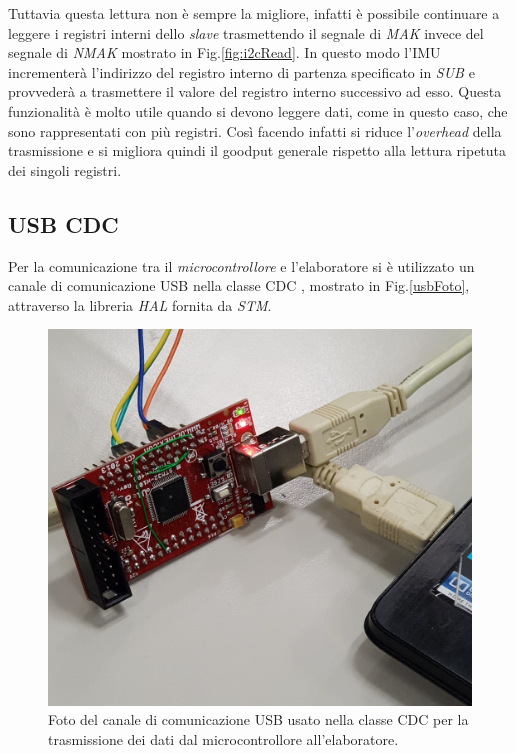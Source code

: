 Tuttavia questa lettura non è sempre la migliore, infatti è possibile continuare a leggere i registri interni dello \textit{slave} trasmettendo il segnale di \textit{MAK} invece del segnale di \textit{NMAK} mostrato in Fig.\ref{fig:i2cRead}. In questo modo l'IMU incrementerà l'indirizzo del registro interno di partenza specificato in \textit{SUB} e provvederà a trasmettere il valore del registro interno successivo ad esso. Questa funzionalità è molto utile quando si devono leggere dati, come in questo caso, che sono rappresentati con più registri. Così facendo infatti si riduce l'\textit{overhead} della trasmissione e si migliora quindi il goodput generale rispetto alla lettura ripetuta dei singoli registri.\\

 
	
\subsection{USB CDC}
\label{imp_usbcdc}
Per la comunicazione tra il \textit{microcontrollore} e l'elaboratore si è utilizzato un canale di comunicazione USB nella classe CDC \cite{usbCDC}, mostrato in Fig.\ref{usbFoto}, attraverso la libreria \textit{HAL} \cite{hal} fornita da \textit{STM}.
\begin{figure}[H]  
	\centering 
	\includegraphics[scale=0.1]{implementazione/usbFoto.jpg}
	\caption{Foto del canale di comunicazione USB usato nella classe CDC per la trasmissione dei dati dal microcontrollore all'elaboratore.}
	\label{fig:usbFoto}
\end{figure}
